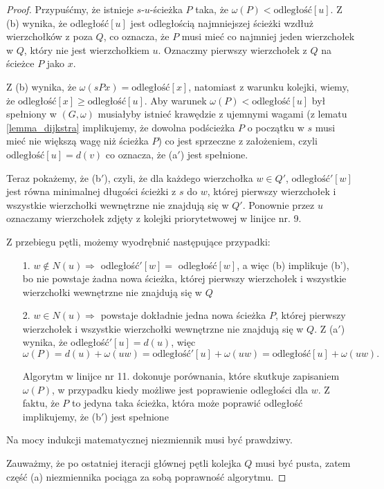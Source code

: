 \begin{theorem}
\begin{proof}
		Przypuśćmy, że istnieje 
		$s$-$u$-ścieżka $P$ taka, że $\omega(P) < \text{odległość}[u]$. 
		Z (b) wynika, że odległość$[u]$ jest odległością 
		najmniejszej ścieżki wzdłuż wierzchołków z poza $Q$, co
		oznacza, że $P$ musi mieć co najmniej jeden wierzchołek 
		w $Q$, który nie jest wierzchołkiem $u$. 
		Oznaczmy pierwszy wierzchołek z $Q$ na ścieżce $P$ jako $x$. 
		
		Z (b) wynika, że $\omega(sPx) = \text{odległość}[x]$, natomiast
		z warunku kolejki, wiemy, że
		$\text{odległość}[x] \geq \text{odległość}[u]$. Aby 
		warunek $\omega(P) < \text{odległość}[u]$ był spełniony
		w $(G, \omega)$ musiałyby istnieć krawędzie 
		z ujemnymi wagami (z lematu \ref{lemma_dijkstra} implikujemy, że
		dowolna podścieżka $P$ o początku w $s$
		musi mieć nie większą wagę niż ścieżka $P$) co jest sprzeczne z założeniem, czyli
		$\text{odległość}[u] = d(v)$
		co oznacza, że (a$'$) jest spełnione.
		
		Teraz pokażemy, że (b$'$), czyli, że
		dla każdego wierzchołka $w \in Q'$, 
		$\text{odległość}'[w]$ jest równa minimalnej długości
		ścieżki z $s$ do $w$, której pierwszy wierzchołek i 
		wszystkie wierzchołki wewnętrzne 
		nie znajdują się w $Q'$. Ponownie 
		przez $u$ oznaczamy wierzchołek
		zdjęty z kolejki priorytetwowej w linijce nr. 9.
		
		Z przebiegu pętli, możemy wyodrębnić następujące 
		przypadki: 
		\begin{itemize}
			\item[1.] $w \not \in N(u) \Rightarrow$ 
			odległość$'[w]=$ odległość$[w]$, a więc (b) 
			implikuje (b'), bo nie powstaje żadna nowa ścieżka, 
			której pierwszy wierzchołek i wszystkie wierzchołki
			wewnętrzne nie znajdują się w $Q$
			\item[2.] $w \in N(u) \Rightarrow$ 
			powstaje dokładnie jedna nowa ścieżka $P$, 
			której pierwszy wierzchołek i wszystkie wierzchołki
			wewnętrzne nie znajdują się w $Q$. Z (a$'$) wynika, że
			odległość$'[u] = d(u)$, więc 
			\[\omega(P) = d(u) + \omega(uw) = \text{odległość}'[u] + \omega(uw) = \text{odległość}[u] + \omega(uw).\]
			
			Algorytm w linijce nr 11. dokonuje porównania, które 
			skutkuje zapisaniem $\omega(P)$, w przypadku
			kiedy możliwe jest poprawienie odległości dla $w$. Z faktu, że
			$P$ to jedyna taka ścieżka, która może poprawić odległość
			implikujemy, że (b$'$) jest spełnione
		\end{itemize}
		
		
		
		Na mocy indukcji matematycznej niezmiennik musi być prawdziwy.
		
		Zauważmy, że po ostatniej iteracji głównej pętli kolejka $Q$ musi być pusta,
		zatem część (a) niezmiennika pociąga za sobą
		poprawność algorytmu.
	\end{proof}
	\label{dijkstra_proof}
\end{theorem}


